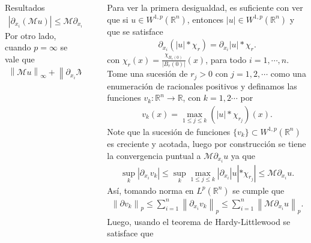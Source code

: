 \documentclass[final]{beamer}
\providecommand{\norm}[1]{\left\|#1\right\|}
\newlength{\sepwidth}
\newlength{\colwidth}
\newcommand{\separatorcolumn}{\begin{column}{\sepwidth}\end{column}}
\begin{document}
\begin{frame}[t]
\begin{columns}[t]
\begin{column}{\colwidth}
\begin{alertblock}{Resultados}
      \begin{align*}
        |\partial_{x_i}(\mathcal{M}u)|\leq \mathcal{M}\partial_{x_i}u.
      \end{align*}
      Por otro lado, cuando $p=\infty$ se vale que
      \begin{align*}
        \norm{\mathcal{M}u}_{\infty}+\norm{\partial_{x_i}\mathcal{M}u}_{\infty}\leq \norm{u}_{\infty}+\norm{\mathcal{M}|\partial_{x_i}u|}_{\infty}.
      \end{align*}
  \end{alertblock}
\end{column}

\separatorcolumn

\begin{column}{\colwidth}

  \begin{alertblock}{}
      Para ver la primera desigualdad, es suficiente con ver que si $u\in W^{1,p}(\mathbb{R}^{n})$, entonces $|u|\in W^{1,p}(\mathbb{R}^{n})$ y que se satisface
      \begin{align*}
        \partial_{x_i}\left( |u|*\chi_{r} \right)=\partial_{x_i}|u|*\chi_{r}.
      \end{align*}
      con $\chi_{r}(x)=\frac{\chi_{B_{r}(0)}}{|B_{r}(0)|}(x)$, para todo $i=1,\cdots,n$.\\
      Tome una sucesión de $r_{j}>0$ con $j=1,2,\cdots$ como una enumeración de racionales positivos y definamos las funciones $v_{k}:\mathbb{R}^{n}\to\mathbb{R}$, con $k=1,2\cdots$ por 
      \begin{align*}
        v_{k}(x)=\max_{1\leq j\leq k}\left( |u|*\chi_{r_{j}} \right)(x).
      \end{align*}
      Note que la sucesión de funciones $\{v_{k}\}\subset W^{1,p}(\mathbb{R}^{n})$ es creciente y acotada, luego por construcción se tiene la convergencia puntual a $\mathcal{M}\partial_{x_i}u$ ya que
      \begin{align*}
        \sup_{k}|\partial_{x_i}v_{k}|\leq\sup_{k}\max_{1\leq j\leq k}|\partial_{x_i}|u|*\chi_{r_{j}}|\leq \mathcal{M}\partial_{x_i}u.
      \end{align*}
      Así, tomando norma en $L^{p}(\mathbb{R}^{n})$ se cumple que
      \begin{align*}
        \norm{\partial v_{k}}_{p}\leq\sum_{i=1}^{n}\norm{\partial_{x_{i}}v_k}_{p}\leq\sum_{i=1}^{n}\norm{\mathcal{M}\partial_{x_i} u}_{p}.
      \end{align*}
      Luego, usando el teorema de Hardy-Littlewood se satisface que

\end{alertblock}
\end{column}
\end{columns}
\end{frame}
\end{document}
